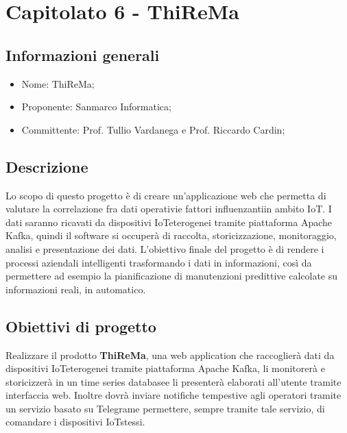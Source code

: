 \section{Capitolato 6 - ThiReMa}
\subsection{Informazioni generali}
\begin{itemize}
	\item Nome: ThiReMa;
	\item Proponente: Sanmarco Informatica;
	\item Committente: Prof. Tullio Vardanega e Prof. Riccardo Cardin;
\end{itemize}
\subsection{Descrizione}
Lo scopo di questo progetto è di creare un'applicazione web che permetta di valutare la correlazione fra dati operativi\glosp e fattori influenzanti\glo in ambito IoT\glo. I dati saranno ricavati da dispositivi IoT\glosp eterogenei tramite piattaforma Apache Kafka\glo, quindi il software si occuperà di raccolta, storicizzazione, monitoraggio, analisi e presentazione dei dati.
L'obiettivo finale del progetto è di rendere i processi aziendali intelligenti trasformando i dati in informazioni, così da permettere ad esempio la pianificazione di manutenzioni predittive calcolate su informazioni reali, in automatico.

\subsection{Obiettivi di progetto}
Realizzare il prodotto \textbf{ThiReMa}, una web application che raccoglierà dati da dispositivi IoT\glosp eterogenei tramite piattaforma Apache Kafka, li monitorerà e storicizzerà in un time series database\glosp e li presenterà elaborati all'utente tramite interfaccia web. Inoltre dovrà inviare notifiche tempestive agli operatori tramite un servizio basato su Telegram\glo e permettere, sempre tramite tale servizio, di comandare i dispositivi IoT\glosp stessi.

